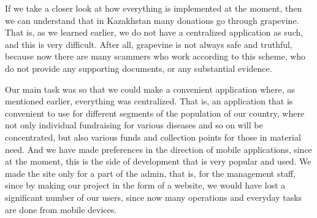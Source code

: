 If we take a closer look at how everything is implemented at the moment, then we can understand that in Kazakhstan many donations go through grapevine. That is, as we learned earlier, we do not have a centralized application as such, and this is very difficult. After all, grapevine is not always safe and truthful, because now there are many scammers who work according to this scheme, who do not provide any supporting documents, or any substantial evidence.

Our main task was so that we could make a convenient application where, as mentioned earlier, everything was centralized. That is, an application that is convenient to use for different segments of the population of our country, where not only individual fundraising for various diseases and so on will be concentrated, but also various funds and collection points for those in material need. And we have made preferences in the direction of mobile applications, since at the moment, this is the side of development that is very popular and used. We made the site only for a part of the admin, that is, for the management staff, since by making our project in the form of a website, we would have lost a significant number of our users, since now many operations and everyday tasks are done from mobile devices.




